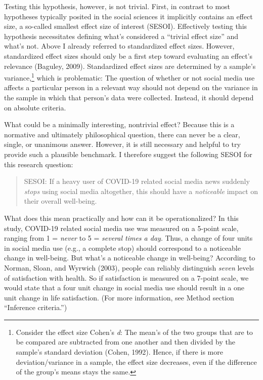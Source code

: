 \documentclass[
  english,
  man,mask,floatsintext]{apa6}
\begin{document}
Testing this hypothesis, however, is not trivial.
First, in contrast to most hypotheses typically posited in the social sciences it implicitly contains an effect size, a so-called smallest effect size of interest (SESOI).
Effectively testing this hypothesis necessitates defining what's considered a ``trivial effect size'' and what's not.
Above I already referred to standardized effect sizes.
However, standardized effect sizes should only be a first step toward evaluating an effect's relevance (Baguley, 2009).
Standardized effect sizes are determined by a sample's variance,\footnote{Consider the effect size Cohen's \emph{d}: The mean's of the two groups that are to be compared are subtracted from one another and then divided by the sample's standard deviation (Cohen, 1992). Hence, if there is more deviation/variance in a sample, the effect size decreases, even if the difference of the group's means stays the same.} which is problematic:
The question of whether or not social media use affects a particular person in a relevant way should not depend on the variance in the sample in which that person's data were collected.
Instead, it should depend on absolute criteria.

What could be a minimally interesting, nontrivial effect?
Because this is a normative and ultimately philosophical question, there can never be a clear, single, or unanimous answer.
However, it is still necessary and helpful to try provide such a plausible benchmark.
I therefore suggest the following SESOI for this research question:

\begin{quote}
SESOI: If a heavy user of COVID-19 related social media news suddenly \emph{stops} using social media altogether, this should have a \emph{noticeable} impact on their overall well-being.
\end{quote}

What does this mean practically and how can it be operationalized?
In this study, COVID-19 related social media use was measured on a 5-point scale, ranging from 1 = \emph{never} to 5 = \emph{several times a day}.
Thus, a change of four units in social media use (e.g., a complete stop) should correspond to a noticeable change in well-being.
But what's a noticeable change in well-being?
According to Norman, Sloan, and Wyrwich (2003), people can reliably distinguish \emph{seven} levels of satisfaction with health.
So if satisfaction is measured on a 7-point scale, we would state that a four unit change in social media use should result in a one unit change in life satisfaction.
(For more information, see Method section ``Inference criteria.'')
\end{document}
